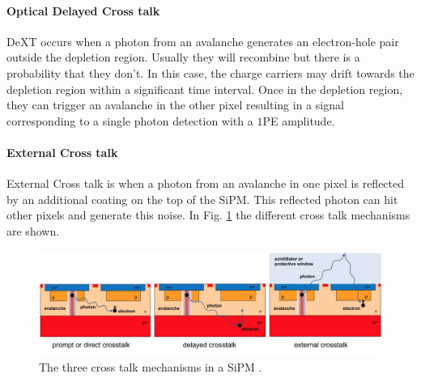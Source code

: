\paragraph{Optical Delayed Cross talk}
\ac{DeXT} occurs when a photon from an avalanche generates an electron-hole pair outside the depletion region. Usually they will recombine but there is a probability that they don't. In this case, the charge carriers may drift towards the depletion region within a significant time interval. Once in the depletion region, they can trigger an avalanche in the other pixel resulting in a signal corresponding to a single photon detection with a $1$PE amplitude. 

\paragraph{External Cross talk} External Cross talk is when a photon from an avalanche in one pixel is reflected by an additional coating on the top of the SiPM. This reflected photon can hit other pixels and generate this noise. In Fig. \ref{fig:all different cross talks} the different cross talk mechanisms are shown. 

\begin{figure}[htbp]
    \centering
    \includegraphics[width=\textwidth]{gfx/schemes/external_xTs.png}
    \caption{The three cross talk mechanisms in a SiPM \cite{ClaudioPiemonte2013PerformanceApplication}.}
    \label{fig:all different cross talks}
\end{figure}

